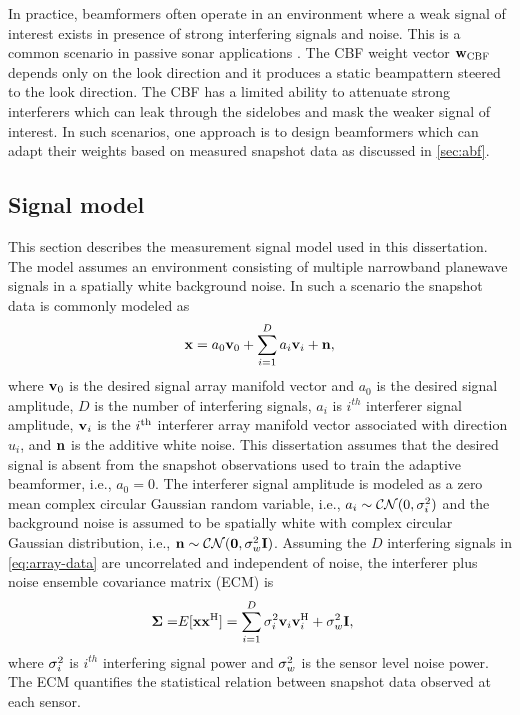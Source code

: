 In practice, beamformers often operate in an environment where a weak
signal of interest exists in presence of strong interfering signals
and noise. This is a common scenario in passive sonar applications
\cite{cox2002adaptive,baggeroer1999passive}. The CBF weight vector
${\bf w}_{\rm CBF}$ depends only on the look direction and it produces a static
beampattern steered to the look direction. The CBF has a limited
ability to attenuate strong interferers which can leak through the
sidelobes and mask the weaker signal of interest. In such scenarios,
one approach is to design beamformers which can adapt their weights
based on measured snapshot data as discussed in \sect{}\ref{sec:abf}.

\subsection{Signal model}
\label{sec:signal-model}
This section describes the measurement signal model used in this
dissertation. The model assumes an environment consisting of multiple
narrowband planewave signals in a spatially white background noise. In
such a scenario the snapshot data is commonly modeled as
\begin{equation}
  \label{eq:array-data} {\bf x} = a_0{\bf v}_0 + \sum\limits_{i=1}^D a_i{\bf v}_i +
{\bf n},
\end{equation}
where ${\bf v}_0$ is the desired signal array manifold vector and $a_0$
is the desired signal amplitude, $D$ is the number of interfering
signals, $a_i$ is $i^{th}$ interferer signal amplitude, ${\bf v}_i$ is
the $i^{\rm th}$ interferer array manifold vector associated with direction
$u_i$, and ${\bf n}$ is the additive white noise. This dissertation
assumes that the desired signal is absent from the snapshot
observations used to train the adaptive beamformer, i.e., $a_0 =
0$.
The interferer signal amplitude is modeled as a zero mean complex
circular Gaussian random variable, i.e.,
$a_i \sim \cnormal{0, \cov_i^2}$ and the background noise is assumed
to be spatially white with complex circular Gaussian distribution,
i.e., $\noisevec \sim \cnormal{\mathbf{0}, \cov_w^2\eye}$. Assuming
the $D$ interfering signals in \eqref{eq:array-data} are uncorrelated
and independent of noise, the interferer plus noise ensemble
covariance matrix (ECM) is
\begin{align}
  \label{eq:ecm} \boldsymbol{\Sigma} =& E[{\bf x}{\bf x}^{\rm H}] = \sum\limits_{i =
1}^D\sigma_i^2{\bf v}_i{\bf v}_i^{\rm H} + \sigma_w^2{\bf I},
\end{align}
where $\sigma_i^2$ is $i^{th}$ interfering signal power and $\sigma_w^2$
is the sensor level noise power. The ECM quantifies the statistical
relation between snapshot data observed at each sensor.


